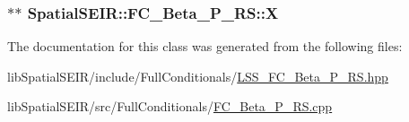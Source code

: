 \hypertarget{classSpatialSEIR_1_1FC__Beta__P__RS_a72f85c7949041f789c8a33cfd2e4f852}{
\subsubsection[{X}]{$\ast$$\ast$ Spatial\-S\-E\-I\-R\-::\-F\-C\-\_\-\-Beta\-\_\-\-P\-\_\-\-R\-S\-::\-X}}\label{classSpatialSEIR_1_1FC__Beta__P__RS_a72f85c7949041f789c8a33cfd2e4f852}


The documentation for this class was generated from the following files\-:\begin{DoxyCompactItemize}
\item 
lib\-Spatial\-S\-E\-I\-R/include/\-Full\-Conditionals/\hyperlink{LSS__FC__Beta__P__RS_8hpp}{L\-S\-S\-\_\-\-F\-C\-\_\-\-Beta\-\_\-\-P\-\_\-\-R\-S.\-hpp}\item 
lib\-Spatial\-S\-E\-I\-R/src/\-Full\-Conditionals/\hyperlink{FC__Beta__P__RS_8cpp}{F\-C\-\_\-\-Beta\-\_\-\-P\-\_\-\-R\-S.\-cpp}\end{DoxyCompactItemize}
